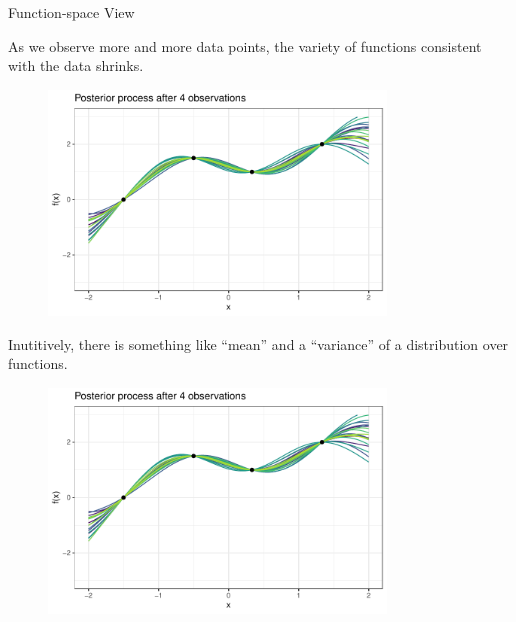 \documentclass[11pt,compress,t,notes=noshow, xcolor=table]{beamer}
\begin{document}
\begin{vbframe}{Function-space View}
\framebreak 

As we observe more and more data points, the variety of functions consistent with the data shrinks. 
  \begin{figure}
    \includegraphics[width=0.8\textwidth]{figure/gp_sample/2_4.pdf}
  \end{figure}

\framebreak 

Inutitively, there is something like \enquote{mean} and a \enquote{variance} of a distribution over functions. 

  \begin{figure}
    \includegraphics[width=0.8\textwidth]{figure/gp_sample/2_4.pdf}
  \end{figure}

\end{vbframe}
\end{document}
